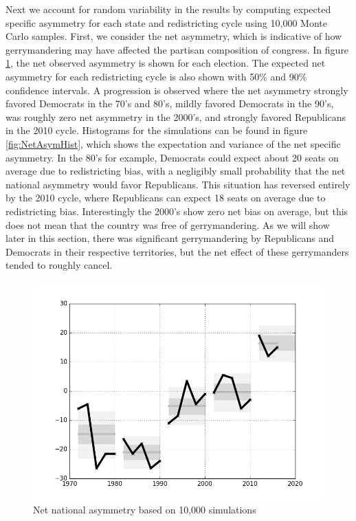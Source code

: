 \documentclass[preprint,12pt]{article}
\begin{document}
Next we account for random variability in the results by computing expected specific asymmetry for each state and redistricting cycle using 10,000 Monte Carlo samples.
First, we consider the net asymmetry, which is indicative of how gerrymandering may have affected the partisan composition of congress.
In figure \ref{fig:NetAsym}, the net observed asymmetry is shown for each election.
The expected net asymmetry for each redistricting cycle is also shown with 50\% and 90\% confidence intervals.
A progression is observed where the net asymmetry strongly favored Democrats in the 70's and 80's, mildly favored Democrats in the 90's, was roughly zero net asymmetry in the 2000's, and strongly favored Republicans in the 2010 cycle.
Histograms for the simulations can be found in figure \ref{fig:NetAsymHist}, which shows the expectation and variance of the net specific asymmetry.
In the 80's for example, Democrats could expect about 20 seats on average due to redistricting bias, with a negligibly small probability that the net national asymmetry would favor Republicans.
This situation has reversed entirely by the 2010 cycle, where Republicans can expect 18 seats on average due to redistricting bias.
Interestingly the 2000's show zero net bias on average, but this does not mean that the country was free of gerrymandering.
As we will show later in this section, there was significant gerrymandering by Republicans and Democrats in their respective territories, but the net effect of these gerrymanders tended to roughly cancel.
\begin{figure}[htb!]
    \begin{center}
        \includegraphics[scale=0.8]{../Figures/ExpectedAsymmetry/netAsym.png}
        \caption{Net national asymmetry based on 10,000 simulations}\label{fig:NetAsym}
    \end{center}
\end{figure}
\end{document}
